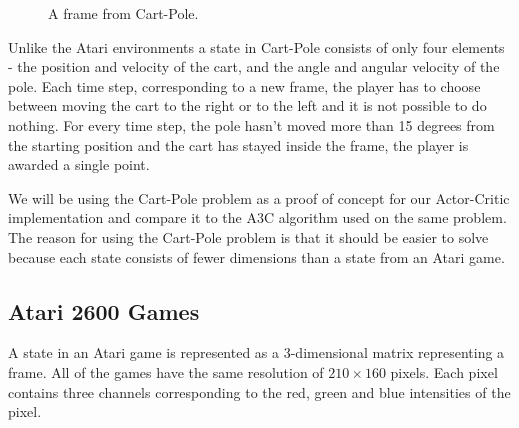 \documentclass[11pt]{article}
\begin{document}
\begin{figure}[!h]
    \centering
    \caption{A frame from Cart-Pole.}
    \label{fig:cartpole}
\end{figure}

Unlike the Atari environments a state in Cart-Pole consists of only four elements - the position and velocity of the cart, and the
angle and angular velocity of the pole.
Each time step, corresponding to a new frame, the player has to choose between moving the cart to the right or to the left and it is not possible
to do nothing.
For every time step, the pole hasn't moved more than 15 degrees from the starting position and
the cart has stayed inside the frame, the player is awarded a single point.

We will be using the Cart-Pole problem as a proof of concept for our Actor-Critic implementation and
compare it to the A3C algorithm used on the same problem.
The reason for using the Cart-Pole problem is that it should be easier
to solve because each state consists of fewer dimensions than a state
from an Atari game.


\subsection{Atari 2600 Games}\label{sec:atari}

A state in an Atari game is represented as a 3-dimensional matrix representing a
frame.
All of the games have the same resolution of $210 \times 160$ pixels.
Each pixel contains three channels corresponding to the red, green and blue intensities of the pixel.
\end{document}
